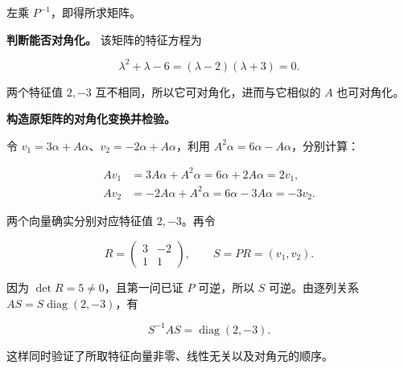 \documentclass[UTF8,11pt,fontset=windows]{ctexart}
\begin{document}
左乘 $P^{-1}$，即得所求矩阵。

\textbf{判断能否对角化。} 该矩阵的特征方程为

$$
\lambda^2+\lambda-6=(\lambda-2)(\lambda+3)=0.
$$

两个特征值 $2,-3$ 互不相同，所以它可对角化，进而与它相似的 $A$ 也可对角化。

\textbf{构造原矩阵的对角化变换并检验。}

令 $v_1=3\alpha+A\alpha$、$v_2=-2\alpha+A\alpha$，利用 $A^2\alpha=6\alpha-A\alpha$，分别计算：

$$
\begin{aligned}
Av_1&=3A\alpha+A^2\alpha
=6\alpha+2A\alpha=2v_1,\\
Av_2&=-2A\alpha+A^2\alpha
=6\alpha-3A\alpha=-3v_2.
\end{aligned}
$$

两个向量确实分别对应特征值 $2,-3$。再令

$$
R=\begin{pmatrix}3&-2\\1&1\end{pmatrix},
\qquad S=PR=(v_1,v_2).
$$

因为 $\det R=5\ne0$，且第一问已证 $P$ 可逆，所以 $S$ 可逆。由逐列关系 $AS=S\operatorname{diag}(2,-3)$，有

$$
\boxed{S^{-1}AS=\operatorname{diag}(2,-3)}.
$$

这样同时验证了所取特征向量非零、线性无关以及对角元的顺序。
\end{document}
